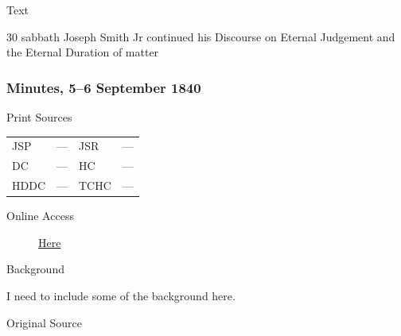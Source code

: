			\begin{description}
				\item[Text]
			\end{description}
			
				30 sabbath Joseph Smith Jr continued his Discourse on Eternal Judgement and the Eternal Duration of matter
				
		\subsubsection{Minutes, 5--6 September 1840}
			\label{EMS-1840-JS-5-6-SEP-1840}
			
			\begin{description}
				\item[Print Sources]
			\end{description}

			\begin{tabular}{p{0.5in}p{1in}p{0.5in}p{1in}}
				JSP	 	& ---		& JSR 		& --- \\
				DC	 	& ---		& HC 		& --- \\
				HDDC 	& ---		& TCHC 		& --- \\
			\end{tabular}
			
			\begin{description}
				\item[Online Access] \href{https://www.josephsmithpapers.org/paper-summary/minutes-5-6-september-1840/1}{Here}
			\end{description}
			
			\begin{description}
				\item[Background]
			\end{description}
			
				I need to include some of the background here.
			
			
			\begin{description}
				\item[Original Source]
			\end{description}
			
